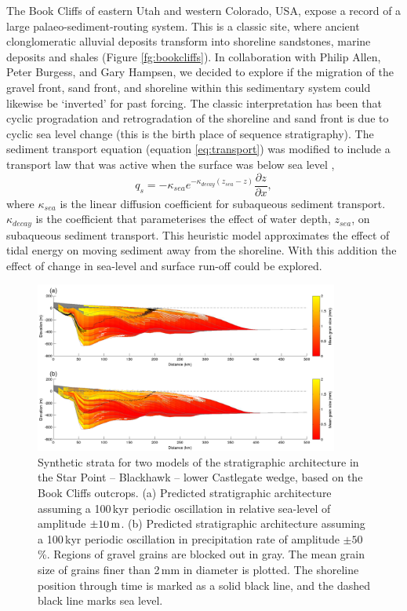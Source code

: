 The Book Cliffs of eastern Utah and western Colorado, USA, expose a record of a large palaeo-sediment-routing system. This is a classic site, where ancient clonglomeratic alluvial deposits transform into shoreline sandstones, marine deposits and shales (Figure \ref{fg:bookcliffs}). In collaboration with Philip Allen, Peter Burgess, and Gary Hampsen, we decided to explore if the migration of the gravel front, sand front, and shoreline within this sedimentary system could likewise be `inverted' for past forcing. The classic interpretation has been that cyclic progradation and retrogradation of the shoreline and sand front is due to cyclic sea level change (this is the birth place of sequence stratigraphy). The sediment transport equation (equation \ref{eq:transport}) was modified to include a transport law that was active when the surface was below sea level \citep{kaufman-etal-1991},
\begin{equation}
q_{s} = -\kappa_{sea}e^{-\kappa_{decay}\left(z_{sea}-z\right)}\frac{\partial z}{\partial x},
\end{equation}
where $\kappa_{sea}$ is the linear diffusion coefficient for subaqueous sediment transport. $\kappa_{decay}$ is the coefficient that parameterises the effect of water depth, $z_{sea}$, on subaqueous sediment transport. This heuristic model approximates the effect of tidal energy on moving sediment away from the shoreline. With this addition the effect of change in sea-level and surface run-off could be explored.

\begin{figure}
\centering
\includegraphics[width=10cm]{./figures/ch2-bookcliffs-model.pdf}
\caption{Synthetic strata for two models of the stratigraphic architecture in the Star Point -- Blackhawk -- lower Castlegate wedge, based on the Book Cliffs outcrops. (a) Predicted stratigraphic architecture assuming a 100\,kyr periodic oscillation in relative sea-level of amplitude $\pm 10\rm\,m$. (b) Predicted stratigraphic architecture assuming a 100\,kyr periodic oscillation in precipitation rate of amplitude $\pm 50$\,\%. Regions of gravel grains are blocked out in gray. The mean grain size of grains finer than 2\,mm in diameter is plotted. The shoreline position through time is marked as a solid black line, and the dashed black line marks sea level.}
\label{fg:bookcliffs-model}
\end{figure}

